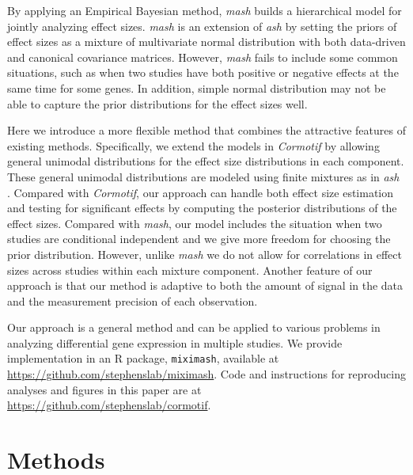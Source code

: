 \documentclass[12pt]{article}
\begin{document}
\vspace{4mm}\noindent By applying an Empirical Bayesian method, \emph{mash} \cite{Urbut2017} builds a hierarchical model for jointly analyzing effect sizes. \emph{mash} is an extension of \emph{ash} by setting the priors of effect sizes as a mixture of multivariate normal distribution with both data-driven and canonical covariance matrices. However, \emph{mash} fails to include some common situations, such as when two studies have both positive or negative effects at the same time for some genes. In addition, simple normal distribution may not be able to capture the prior distributions for the effect sizes well. 

\vspace{4mm}\noindent Here we introduce a more flexible method that combines the attractive features of existing methods. Specifically, we extend the models in \emph{Cormotif} \cite{Wei2015} by allowing general unimodal distributions for the effect size distributions in each component. These general unimodal distributions are modeled using finite mixtures as in \emph{ash} \cite{Stephens2017}. Compared with \emph{Cormotif}, our approach can handle both effect size estimation and testing for significant effects by computing the posterior distributions of the effect sizes. Compared with \emph{mash}, our model includes the situation when two studies are conditional independent and we give more freedom for choosing the prior distribution. However, unlike \emph{mash} we do not allow for correlations in effect sizes across studies within each mixture component. Another feature of our approach is that our method is adaptive to both the amount of signal in the data and the measurement precision of each observation. 

\vspace{4mm}\noindent Our approach is a general method and can be applied to various problems in analyzing differential gene expression in multiple studies. We provide implementation in an R package, {\tt miximash}, available at \url{https://github.com/stephenslab/miximash}. Code and instructions for reproducing analyses and figures in this paper are at \url{https://github.com/stephenslab/cormotif}. 

\newpage
\section{Methods}
\end{document}
